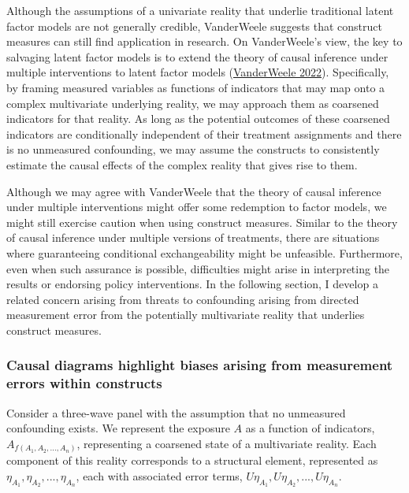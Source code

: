 \documentclass[
  singlecolumn]{article}
\begin{document}
Although the assumptions of a univariate reality that underlie
traditional latent factor models are not generally credible, VanderWeele
suggests that construct measures can still find application in research.
On VanderWeele's view, the key to salvaging latent factor models is to
extend the theory of causal inference under multiple interventions to
latent factor models
(\protect\hyperlink{ref-vanderweele2022}{VanderWeele 2022}).
Specifically, by framing measured variables as functions of indicators
that may map onto a complex multivariate underlying reality, we may
approach them as coarsened indicators for that reality. As long as the
potential outcomes of these coarsened indicators are conditionally
independent of their treatment assignments and there is no unmeasured
confounding, we may assume the constructs to consistently estimate the
causal effects of the complex reality that gives rise to them.

Although we may agree with VanderWeele that the theory of causal
inference under multiple interventions might offer some redemption to
factor models, we might still exercise caution when using construct
measures. Similar to the theory of causal inference under multiple
versions of treatments, there are situations where guaranteeing
conditional exchangeability might be unfeasible. Furthermore, even when
such assurance is possible, difficulties might arise in interpreting the
results or endorsing policy interventions. In the following section, I
develop a related concern arising from threats to confounding arising
from directed measurement error from the potentially multivariate
reality that underlies construct measures.

\hypertarget{causal-diagrams-highlight-biases-arising-from-measurement-errors-within-constructs}{%
\subsubsection{Causal diagrams highlight biases arising from measurement
errors within
constructs}\label{causal-diagrams-highlight-biases-arising-from-measurement-errors-within-constructs}}

Consider a three-wave panel with the assumption that no unmeasured
confounding exists. We represent the exposure \(A\) as a function of
indicators, \(A_{f(A_1, A_2, ..., A_n)}\), representing a coarsened
state of a multivariate reality. Each component of this reality
corresponds to a structural element, represented as
\(\eta_{A_1}, \eta_{A_2}, ..., \eta_{A_n}\), each with associated error
terms, \(U\eta_{A_1}, U\eta_{A_2}, ..., U\eta_{A_n}\).
\end{document}
